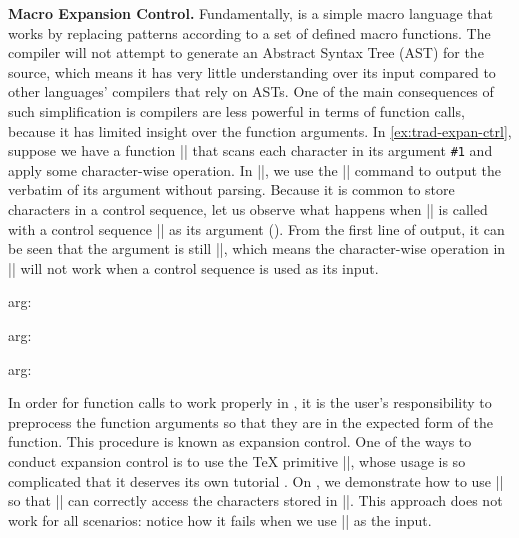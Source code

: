 \documentclass{ltugboat}
\begin{document}
\par\medskip\noindent\textbf{Macro Expansion Control.}
Fundamentally, \LT{} is a simple macro language that works by replacing patterns according to a set of defined macro functions.
The \LT{} compiler will not attempt to generate an Abstract Syntax Tree (AST) for the \LT{} source, which means it has very little understanding over its input compared to other languages' compilers that rely on ASTs.
One of the main consequences of such simplification is \LT{} compilers are less powerful in terms of function calls, because it has limited insight over the function arguments.
In \cref{ex:trad-expan-ctrl}, suppose we have a function \inltex|\cmda| that scans each character in its argument \verb|#1| and apply some character-wise operation. 
In \inltex|\cmda|, we use the \inltex|\detokenize| command to output the verbatim of its argument without parsing.
Because it is common to store characters in a control sequence, let us observe what happens when \inltex|\cmda| is called with a control sequence \inltex|\vala| as its argument ().
From the first line of output, it can be seen that the argument is still \inltex|\vala|, which means the character-wise operation in \inltex|\cmda| will not work when a control sequence is used as its input.
\begin{latexsample}[examplelabel=ex:trad-expan-ctrl,exampletitle={Expansion Control},noexport]
\def\cmda#1{%
  arg: \detokenize{#1} %
}
\def\vala{val-a}
\def\valb{\vala}
\par\cmda{\vala}
\par\expandafter\expandafter\expandafter\cmda\expandafter{\vala}
\par\expandafter\expandafter\expandafter\cmda\expandafter{\valb}
\end{latexsample}
\noindent In order for function calls to work properly in \LT{}, it is the user's responsibility to preprocess the function arguments so that they are in the expected form of the function.
This procedure is known as expansion control.
One of the ways to conduct expansion control is to use the \TeX{} primitive \inltex|\expandafter|, whose usage is so complicated that it deserves its own tutorial \cite{bechtolsheim1988tutorial}.
On , we demonstrate how to use \inltex|\expandafter| so that \inltex|\cmda| can correctly access the characters stored in \inltex|\vala|.
This approach does not work for all scenarios: notice how it fails when we use \inltex|\valb| as the input.
\end{document}
